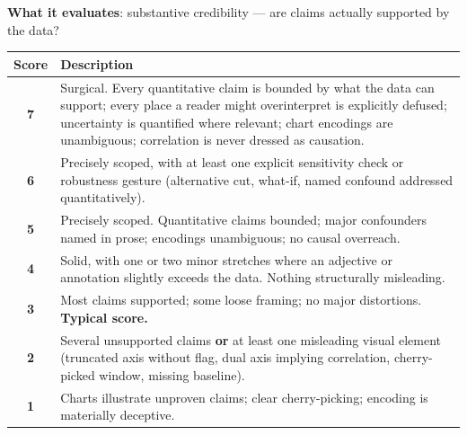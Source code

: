 \begin{tcolorbox}[promptbox, title={Rubric Evaluation scoring guideline}]
\textbf{What it evaluates}: substantive credibility --- are claims actually
supported by the data?
\begin{center}
\small
\begin{tabularx}{\linewidth}{cX}
\toprule
Score & Description \\
\midrule
\textbf{7} & Surgical. Every quantitative claim is bounded by what the data can support; every place a reader might overinterpret is explicitly defused; uncertainty is quantified where relevant; chart encodings are unambiguous; correlation is never dressed as causation. \\
\textbf{6} & Precisely scoped, with at least one explicit sensitivity check or robustness gesture (alternative cut, what-if, named confound addressed quantitatively). \\
\textbf{5} & Precisely scoped. Quantitative claims bounded; major confounders named in prose; encodings unambiguous; no causal overreach. \\
\textbf{4} & Solid, with one or two minor stretches where an adjective or annotation slightly exceeds the data. Nothing structurally misleading. \\
\textbf{3} & Most claims supported; some loose framing; no major distortions. \textbf{Typical score.} \\
\textbf{2} & Several unsupported claims \textbf{or} at least one misleading visual element (truncated axis without flag, dual axis implying correlation, cherry-picked window, missing baseline). \\
\textbf{1} & Charts illustrate unproven claims; clear cherry-picking; encoding is materially deceptive. \\
\bottomrule
\end{tabularx}
\end{center}


\end{tcolorbox}
